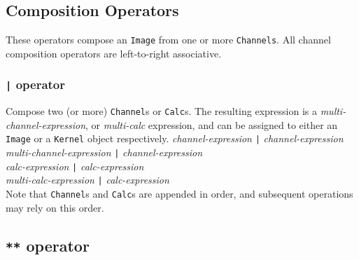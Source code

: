\subsection{Composition Operators}
\label{ssec:compositionops}
These operators compose an \texttt{Image} from one or more \texttt{Channels}.
All channel composition operators are left-to-right associative.

\subsubsection{\texttt{|} operator}
\label{sssec:barop}
Compose two (or more) \texttt{Channel}s or \texttt{Calc}s. The resulting expression is a
\emph{multi-channel-expression}, or \emph{multi-calc} expression, and can be assigned
to either an \texttt{Image} or a \texttt{Kernel} object respectively.
\startsyn
\emph{channel-expression} \texttt{|} \emph{channel-expression} \\
\emph{multi-channel-expression} \texttt{|} \emph{channel-expression} \\
\emph{calc-expression} \texttt{|} \emph{calc-expression} \\
\emph{multi-calc-expression} \texttt{|} \emph{calc-expression} \\
\stopsyn
Note that \texttt{Channel}s and \texttt{Calc}s are appended in order, and
subsequent operations may rely on this order.


\subsection{\texttt{**} operator}
\label{ssec:convolutionop}

